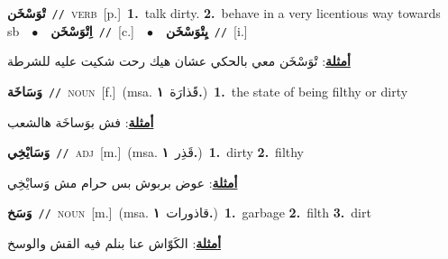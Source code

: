 \documentclass[10pt,a4paper,twoside]{article} %
\begin{document}
\begin{multicols}{2}
{\setlength\topsep{0pt}\textbf{\foreignlanguage{arabic}{تْوَسْخَن}}\ {\color{gray}\texttt{//}\color{black}}\ \textsc{verb}\ [p.]\ \textbf{1.}~talk dirty.  \textbf{2.}~behave in a very licentious way towards sb\ \ $\bullet$\ \ \setlength\topsep{0pt}\textbf{\foreignlanguage{arabic}{اِتْوَسْخَن}}\ {\color{gray}\texttt{//}\color{black}}\ [c.]\ \ $\bullet$\ \ \setlength\topsep{0pt}\textbf{\foreignlanguage{arabic}{يِتْوَسْخَن}}\ {\color{gray}\texttt{//}\color{black}}\ [i.]\  \begin{flushright}\color{gray}\foreignlanguage{arabic}{\textbf{\underline{\foreignlanguage{arabic}{أمثلة}}}: تْوَسْخَن معي بالحكي عشان هيك رحت شكيت عليه للشرطة}\end{flushright}\color{black}} \vspace{2mm}

{\setlength\topsep{0pt}\textbf{\foreignlanguage{arabic}{وَسَاخَة}}\ {\color{gray}\texttt{//}\color{black}}\ \textsc{noun}\ [f.]\ \color{gray}(msa. \foreignlanguage{arabic}{قََذارَة}~\foreignlanguage{arabic}{\textbf{١.}})\color{black}\ \textbf{1.}~the state of being filthy or dirty\  \begin{flushright}\color{gray}\foreignlanguage{arabic}{\textbf{\underline{\foreignlanguage{arabic}{أمثلة}}}: فش بوَساخَة هالشعب}\end{flushright}\color{black}} \vspace{2mm}

{\setlength\topsep{0pt}\textbf{\foreignlanguage{arabic}{وَسَايْخِي}}\ {\color{gray}\texttt{//}\color{black}}\ \textsc{adj}\ [m.]\ \color{gray}(msa. \foreignlanguage{arabic}{قَذِر}~\foreignlanguage{arabic}{\textbf{١.}})\color{black}\ \textbf{1.}~dirty  \textbf{2.}~filthy\  \begin{flushright}\color{gray}\foreignlanguage{arabic}{\textbf{\underline{\foreignlanguage{arabic}{أمثلة}}}: عوض بربوش بس حرام مش وَسايْخِي}\end{flushright}\color{black}} \vspace{2mm}

{\setlength\topsep{0pt}\textbf{\foreignlanguage{arabic}{وَسَخ}}\ {\color{gray}\texttt{//}\color{black}}\ \textsc{noun}\ [m.]\ \color{gray}(msa. \foreignlanguage{arabic}{قاذورات}~\foreignlanguage{arabic}{\textbf{١.}})\color{black}\ \textbf{1.}~garbage  \textbf{2.}~filth  \textbf{3.}~dirt\  \begin{flushright}\color{gray}\foreignlanguage{arabic}{\textbf{\underline{\foreignlanguage{arabic}{أمثلة}}}: الكَوّاش عنا بنلم فيه القش والوسخ}\end{flushright}\color{black}} \vspace{2mm}


\end{multicols}
\end{document}
